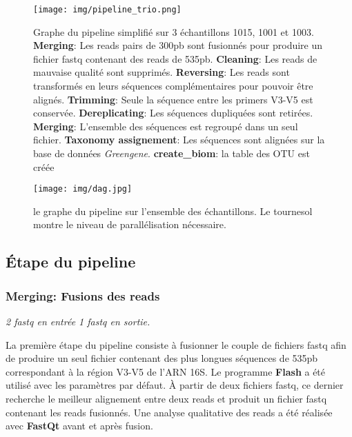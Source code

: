 \documentclass[12pt,a4paper]{article}
\begin{document}
\begin{figure}[!ht]
\begin{center}
\texttt{[image: img/pipeline\_trio.png]}\hfill
\end{center}
\caption{Graphe du pipeline simplifié sur 3 échantillons 1015, 1001 et 1003.\\ \textbf{Merging}: Les reads pairs de 300pb sont fusionnés  pour produire un fichier fastq contenant des reads de 535pb. \textbf{Cleaning}: Les reads de mauvaise qualité sont supprimés. \textbf{Reversing}: Les reads sont transformés en leurs séquences complémentaires pour pouvoir être alignés. \textbf{Trimming}: Seule la séquence entre les primers V3-V5 est conservée. \textbf{Dereplicating}: Les séquences dupliquées sont retirées. \textbf{Merging}: L'ensemble des séquences est regroupé dans un seul fichier. \textbf{Taxonomy assignement}: Les séquences sont alignées sur la base de données \textit{Greengene}. \textbf{create\_biom}: la table des OTU est créée }
\label{pipeline_trio}
\end{figure}


\begin{figure}[ht]
\begin{center}
\texttt{[image: img/dag.jpg]}\hfill
\end{center}
\caption{le graphe du pipeline sur l'ensemble des échantillons. Le tournesol montre le niveau de parallélisation nécessaire.}
\label{dag}
\end{figure}

\subsection{Étape du pipeline}
\subsubsection{Merging: Fusions des reads}
\noindent\emph{ 2 fastq en entrée 1 fastq en sortie. }

La première étape du pipeline consiste à fusionner le couple de fichiers fastq afin de produire un seul fichier contenant des plus longues séquences de 535pb correspondant à la région V3-V5 de l’ARN 16S.
Le programme \textbf{Flash}\cite{Mago2011} a été utilisé avec les paramètres par défaut. À partir de deux fichiers fastq, ce dernier recherche le meilleur alignement entre deux reads et produit un fichier fastq contenant les reads fusionnés.
Une analyse qualitative des reads a été réalisée avec \textbf{FastQt}\citep{Labsquareteam2017} avant et après fusion.
\end{document}
